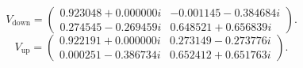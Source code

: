 \begin{equation}V_{\mathrm{down}}=\begin{pmatrix}0.923048+0.000000i & -0.001145-0.384684i\\0.274545-0.269459i & 0.648521+0.656839i\end{pmatrix}.\end{equation}
\begin{equation}V_{\mathrm{up}}=\begin{pmatrix}0.922191+0.000000i & 0.273149-0.273776i\\0.000251-0.386734i & 0.652412+0.651763i\end{pmatrix}.\end{equation}

